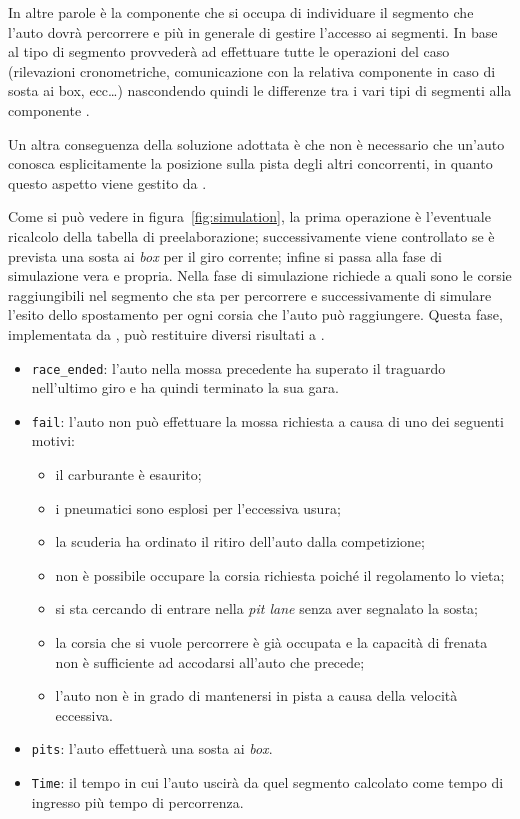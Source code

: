 In altre parole è la componente \track{} che si occupa di individuare il segmento che l'auto dovrà percorrere e più in generale di gestire l'accesso ai segmenti. In base al tipo di segmento \track{} provvederà ad effettuare tutte le operazioni del caso (rilevazioni cronometriche, comunicazione con la relativa componente \team{} in caso di sosta ai box, ecc\ldots) nascondendo quindi le differenze tra i vari tipi di segmenti alla componente \car{}.

Un altra conseguenza della soluzione adottata è che non è necessario che un'auto conosca esplicitamente la posizione sulla pista degli altri concorrenti, in quanto questo aspetto viene gestito da \track{}.


Come si può vedere in figura~\ref{fig:simulation}, la prima operazione è l'eventuale ricalcolo della tabella di preelaborazione; successivamente viene controllato se è prevista una sosta ai \textit{box} per il giro corrente; infine si passa alla fase di simulazione vera e propria. Nella fase di simulazione \car{} richiede a \track{} quali sono le corsie raggiungibili nel segmento che sta per percorrere e successivamente di simulare l'esito dello spostamento per ogni corsia che l'auto può raggiungere. Questa fase, implementata da , può restituire diversi risultati a \car{}.
\begin{itemize}
\item \texttt{race\_ended}: l'auto nella mossa precedente ha superato il traguardo nell'ultimo giro e ha quindi terminato la sua gara.
\item \texttt{fail}: l'auto non può effettuare la mossa richiesta a causa di uno dei seguenti motivi:
        \begin{itemize}
        \item il carburante è esaurito;
        \item i pneumatici sono esplosi per l'eccessiva usura;
        \item la scuderia ha ordinato il ritiro dell'auto dalla competizione;
        \item non è possibile occupare la corsia richiesta poiché il regolamento lo vieta;
        \item si sta cercando di entrare nella \textit{pit lane} senza aver segnalato la sosta;
        \item la corsia che si vuole percorrere è già occupata e la capacità di frenata non è sufficiente ad accodarsi all'auto che precede;
        \item l'auto non è in grado di mantenersi in pista a causa della velocità eccessiva.
        \end{itemize}
\item \texttt{pits}: l'auto effettuerà una sosta ai \textit{box}.
\item \texttt{Time}: il tempo in cui l'auto uscirà da quel segmento calcolato come tempo di ingresso più tempo di percorrenza.
\end{itemize}
